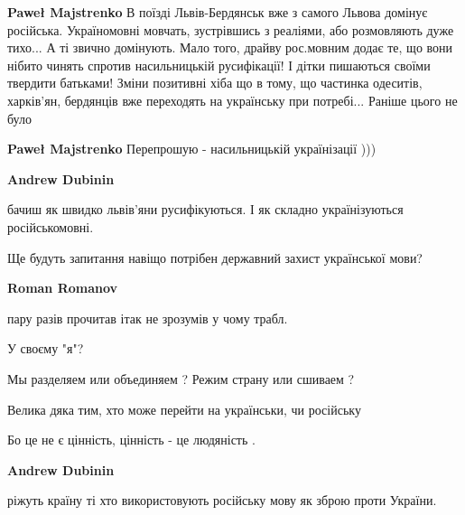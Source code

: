 \begin{itemize}
\begin{itemize}
\textbf{Paweł Majstrenko} В поїзді Львів-Бердянськ вже з самого Львова домінує російська. Україномовні мовчать, зустрівшись з реаліями, або розмовляють дуже тихо... А ті звично домінують. Мало того, драйву рос.мовним додає те, що вони нібито чинять спротив насильницькій русифікації! І дітки пишаються своїми твердити батьками! Зміни позитивні хіба що в тому, що частинка одеситів, харків'ян, бердянців вже переходять на українську при потребі... Раніше цього не було

 
\textbf{Paweł Majstrenko} Перепрошую - насильницькій українізації )))
\end{itemize}

 
\textbf{Andrew Dubinin} 

бачиш як швидко львів'яни русифікуються. І як складно українізуються
російськомовні.

Ще будуть запитання навіщо потрібен державний захист української мови?

\begin{itemize}


\textbf{Roman Romanov} 

пару разів прочитав ітак не зрозумів у чому трабл.

У своєму "я"?

Мы разделяем или объединяем ? Режим страну или сшиваем ?

Велика дяка тим, хто може перейти на українськи, чи російську

Бо це не є цінність, цінність - це людяність .

 
\textbf{Andrew Dubinin} 

ріжуть країну ті хто використовують російську мову як зброю проти України.


\end{itemize}
\end{itemize}
